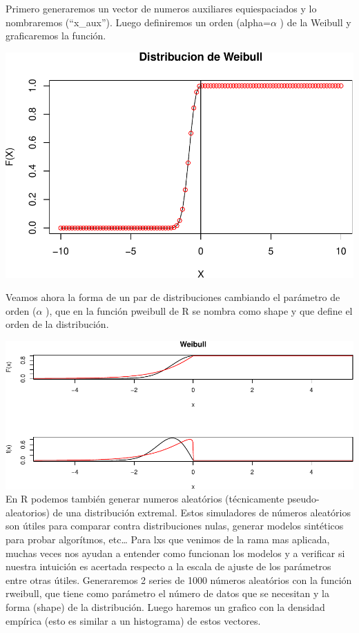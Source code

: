\documentclass[
  oneside]{article}
\begin{document}
Primero generaremos un vector de numeros auxiliares equiespaciados y lo
nombraremos (``x\_aux''). Luego definiremos un orden (alpha=\(\alpha\) )
de la Weibull y graficaremos la función.

\includegraphics{main_files/figure-latex/unnamed-chunk-37-1.pdf}

Veamos ahora la forma de un par de distribuciones cambiando el parámetro
de orden (\(\alpha\) ), que en la función pweibull de R se nombra como
shape y que define el orden de la distribución.

\includegraphics{main_files/figure-latex/unnamed-chunk-38-1.pdf} En R
podemos también generar numeros aleatórios (técnicamente
pseudo-aleatorios) de una distribución extremal. Estos simuladores de
números aleatórios son útiles para comparar contra distribuciones nulas,
generar modelos sintéticos para probar algorítmos, etc\ldots{} Para lxs
que venimos de la rama mas aplicada, muchas veces nos ayudan a entender
como funcionan los modelos y a verificar si nuestra intuición es
acertada respecto a la escala de ajuste de los parámetros entre otras
útiles. Generaremos 2 series de 1000 números aleatórios con la función
rweibull, que tiene como parámetro el número de datos que se necesitan y
la forma (shape) de la distribución. Luego haremos un grafico con la
densidad empírica (esto es similar a un histograma) de estos vectores.
\end{document}
